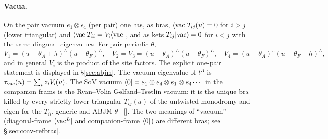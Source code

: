 \paragraph{Vacua.} On the pair vacuum $e_1\otimes e_4$ (per pair) one has, as bras, $\langle\mathrm{vac}|T_{ij}(u)=0$ for $i>j$
(lower triangular) and $\langle\mathrm{vac}|T_{ii}=V_i\langle\mathrm{vac}|$, and as kets $T_{ij}|\mathrm{vac}\rangle=0$ for $i<j$ with the same diagonal
eigenvalues. For pair-periodic $\theta$,
\begin{equation}
 V_1=(u-\theta_A+h)^L(u-\theta_F)^L,\quad V_2=V_3=(u-\theta_A)^L(u-\theta_F)^L,\quad V_4=(u-\theta_A)^L(u-\theta_F-h)^L,
\end{equation}
and in general $V_i$ is the product of the site factors. The explicit one-pair statement is displayed in
\S\ref{sec:abjm}. The vacuum eigenvalue of $t^{\Lambda}$ is $\tau_{\rm vac}(u)=\sum_iz_iV_i(u)$. The SoV vacuum $\langle0|=e_1\otimes
e_4\otimes e_1\otimes e_4\cdots$ in the companion frame is the Ryan--Volin Gelfand--Tsetlin vacuum: it is the unique bra
killed by every strictly lower-triangular $T_{ij}(u)$ of the untwisted monodromy and eigen for the $T_{ii}$, generic and
ABJM $\theta$ \ex\ []. The two meanings of ``vacuum'' (diagonal-frame $\langle\mathrm{vac}^L|$ and
companion-frame $\langle0|$) are different bras; see \S\ref{sec:conv-refbras}.

